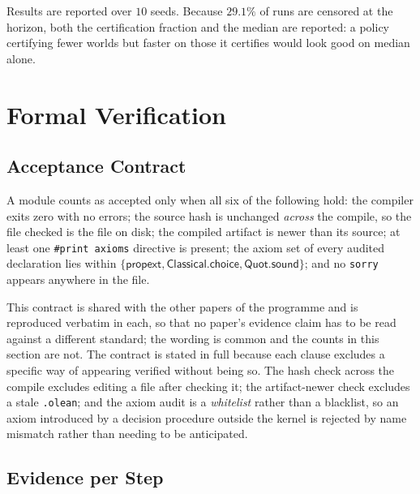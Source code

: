 Results are reported over $10$ seeds. Because $29.1\%$ of runs are censored at the horizon,
both the certification fraction and the median are reported: a policy certifying fewer worlds
but faster on those it certifies would look good on median alone.

\section{Formal Verification}
\label{sec:verification}

\subsection{Acceptance Contract}

A module counts as accepted only when all six of the following hold: the compiler exits zero
with no errors; the source hash is unchanged \emph{across} the compile, so the file checked is
the file on disk; the compiled artifact is newer than its source; at least one
\texttt{\#print axioms} directive is present; the axiom set of every audited declaration lies
within $\{\textsf{propext},\textsf{Classical.choice},\textsf{Quot.sound}\}$; and no
\texttt{sorry} appears anywhere in the file.

This contract is shared with the other papers of the programme and is reproduced verbatim in
each, so that no paper's evidence claim has to be read against a different standard; the
wording is common and the counts in this section are not. The contract is stated in full
because each clause excludes a specific way of appearing verified without being so. The hash check across the compile excludes editing a file after
checking it; the artifact-newer check excludes a stale \texttt{.olean}; and the axiom audit is
a \emph{whitelist} rather than a blacklist, so an axiom introduced by a decision procedure
outside the kernel is rejected by name mismatch rather than needing to be anticipated.

\subsection{Evidence per Step}

